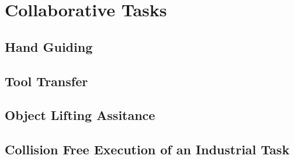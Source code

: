 \chapter{Collaborative Tasks}

\section{Hand Guiding}

\section{Tool Transfer}

\section{Object Lifting Assitance}

\section{Collision Free Execution of an Industrial Task}